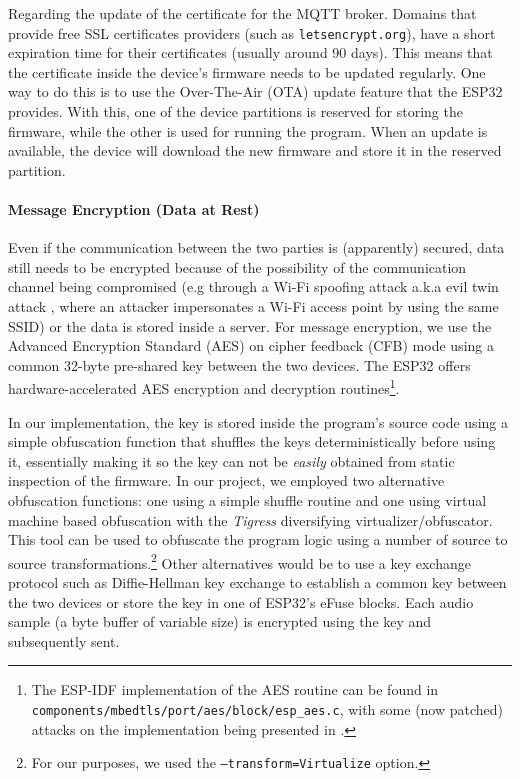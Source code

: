 \documentclass[conference]{IEEEtran}
\begin{document}
Regarding the update of the certificate for the MQTT broker.
Domains that provide free SSL certificates providers (such as \texttt{letsencrypt.org}), have a short expiration time for their certificates (usually around 90 days).
This means that the certificate inside the device's firmware needs to be updated regularly.
One way to do this is to use the Over-The-Air (OTA) update feature that the ESP32 provides.
With this, one of the device partitions is reserved for storing the firmware, while the other is used for running the program.
When an update is available, the device will download the new firmware and store it in the reserved partition.

\paragraph{Message Encryption (Data at Rest)}
\label{par:message_encryption}

Even if the communication between the two parties is (apparently) secured, data still needs to be encrypted because of the possibility 
of the communication channel being compromised (e.g through a Wi-Fi spoofing attack a.k.a evil twin attack \cite{WifiSpoofing}, where an attacker 
impersonates a Wi-Fi access point by using the same SSID) or the data is stored inside a server.
For message encryption, we use the Advanced Encryption Standard (AES) on cipher feedback (CFB) mode using 
a common 32-byte pre-shared key between the two devices.
The ESP32 offers hardware-accelerated AES encryption and decryption routines\footnote{The ESP-IDF implementation of the AES routine can be found in \texttt{components/mbedtls/port/aes/block/esp\_aes.c},
with some (now patched) attacks on the implementation being presented in \cite{PwnEsp32Crypto}.}.

In our implementation, the key is stored inside the program's source code using 
a simple obfuscation function that shuffles the keys deterministically before using it, essentially
making it so the key can not be \textit{easily} obtained from static inspection of the firmware.
In our project, we employed two alternative obfuscation functions: one 
using a simple shuffle routine and one using
virtual machine based obfuscation\cite{VMObfuscation} with the \textit{Tigress}\cite{Tigress} diversifying virtualizer/obfuscator.
This tool can be used to obfuscate the program logic using 
a number of source to source transformations.\footnote{For our purposes, we used the \texttt{--transform=Virtualize} option.}
Other alternatives would be to use a key exchange protocol such as Diffie-Hellman key exchange\cite{DiffieHellmanKeyExchange} to 
establish a common key between the two devices or store the key in one of ESP32's eFuse blocks.
Each audio sample (a byte buffer of variable size) is encrypted using the key 
and subsequently sent.
\end{document}
